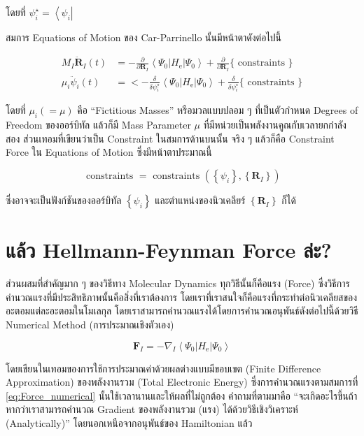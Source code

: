 \noindent โดยที่ $\psi_i^{\star} = \left\langle\psi_i\right|$

สมการ Equations of Motion ของ Car-Parrinello นั้นมีหน้าตาดังต่อไปนี้


\begin{align}
  M_I \ddot{\mathbf{R}}_I(t)
   & =
  -\frac{\partial}{\partial \mathbf{R}_I}\left\langle\Psi_0\left| H_{\mathrm{e}}\right| \Psi_0\right\rangle
  +\frac{\partial}{\partial \mathbf{R}_I}\{\text{ constraints }\} \\
  \mu_i \ddot{\psi}_i(t)
   & =
  <-\frac{\delta}{\delta \psi_i^{\star}}\left\langle\Psi_0\left| H_{\mathrm{e}}\right| \Psi_0\right\rangle
  +\frac{\delta}{\delta \psi_i^{\star}}\{\text{ constraints }\}
\end{align}

\noindent โดยที่ $\mu_i(=\mu)$ คือ \enquote{Fictitious Masses} หรือมวลแบบปลอม ๆ ที่เป็นตัวกำหนด Degrees of Freedom
ของออร์บิทัล แล้วก็มี Mass Parameter $\mu$ ที่มีหน่วยเป็นพลังงานคูณกับเวลายกกำลังสอง ส่วนเทอมที่เขียนว่าเป็น Constraint ในสมการด้านบนนั้น
จริง ๆ แล้วก็คือ Constraint Force ใน Equations of Motion ซึ่งมีหน้าตาประมาณนี้

\begin{equation}
  \text{ constraints }
  =
  \text{ constraints }\left(\left\{\psi_i\right\},\left\{\mathbf{R}_I\right\}\right)
\end{equation}

\noindent ซึ่งอาจจะเป็นฟังก์ชันของออร์บิทัล $\left\{\psi_i\right\}$ และตำแหน่งของนิวเคลียร์ $\left\{\mathbf{R}_I\right\}$ ก็ได้

\section{แล้ว Hellmann-Feynman Force ล่ะ?}

ส่วนผสมที่สำคัญมาก ๆ ของวิธีทาง Molecular Dynamics ทุกวิธีนั้นก็คือแรง (Force) ซึ่งวิธีการคำนวณแรงที่มีประสิทธิภาพนั้นคือสิ่งที่เราต้องการ
โดยเราที่เราสนใจก็คือแรงที่กระทำต่อนิวเคลียสของอะตอมแต่ละอะตอมในโมเลกุล โดยเราสามารถคำนวณแรงได้โดยการคำนวณอนุพันธ์ดังต่อไปนี้ด้วยวิธี
Numerical Method (การประมาณเชิงตัวเอง)

\begin{equation}
  \label{eq:Force_numerical}
  \mathbf{F}_I
  =
  -\nabla_I\left\langle\Psi_0\left| H_{\mathrm{e}}\right| \Psi_0\right\rangle
\end{equation}

\noindent โดยเขียนในเทอมของการใช้การประมาณค่าด้วยผลต่างแบบมีขอบเขต (Finite Difference Approximation) ของพลังงานรวม
(Total Electronic Energy) ซึ่งการคำนวณแรงตามสมการที่ \eqref{eq:Force_numerical} นั้นใช้เวลานานและให้ผลที่ไม่ถูกต้อง
คำถามที่ตามมาคือ \enquote{จะเกิดอะไรขึ้นถ้าหากว่าเราสามารถคำนวณ Gradient ของพลังงานรวม (แรง) ได้ด้วยวิธีเชิงวิเคราะห์ (Analytically)}
โดยนอกเหนือจากอนุพันธ์ของ Hamiltonian แล้ว

